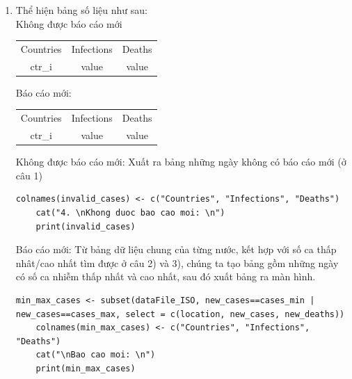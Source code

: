 \documentclass[a4paper]{article}
\theoremstyle{definition}
\begin{document}
\begin{enumerate}[1)]
    \item Thể hiện bảng số liệu như sau:\\
    Không được báo cáo mới
    \begin{center}
      \begin{tabular}{ c c c }
        Countries & Infections & Deaths \\ 
        ctr\_i & value  & value\\ 
      \end{tabular}
    \end{center}
    Báo cáo mới:
    \begin{center}
      \begin{tabular}{ c c c }
        Countries & Infections & Deaths \\ 
        ctr\_i & value  & value\\ 
      \end{tabular}
    \end{center}
    Không được báo cáo mới: Xuất ra bảng những ngày không có báo cáo mới (ở câu 1)
    \begin{lstlisting}[gobble=4]
    colnames(invalid_cases) <- c("Countries", "Infections", "Deaths")
    cat("4. \nKhong duoc bao cao moi: \n") 
    print(invalid_cases)
    \end{lstlisting}
    Báo cáo mới: Từ bảng dữ liệu chung của từng nước, kết hợp với số ca thấp nhât/cao nhất tìm được ở câu 2) và 3), chúng ta tạo bảng gồm những ngày có số ca nhiễm thấp nhất và cao nhất, sau đó xuất bảng ra màn hình.
    \begin{lstlisting}[gobble=4]
    min_max_cases <- subset(dataFile_ISO, new_cases==cases_min | new_cases==cases_max, select = c(location, new_cases, new_deaths))
    colnames(min_max_cases) <- c("Countries", "Infections", "Deaths")
    cat("\nBao cao moi: \n")
    print(min_max_cases)
    \end{lstlisting}
    

\end{enumerate}
\end{document}
